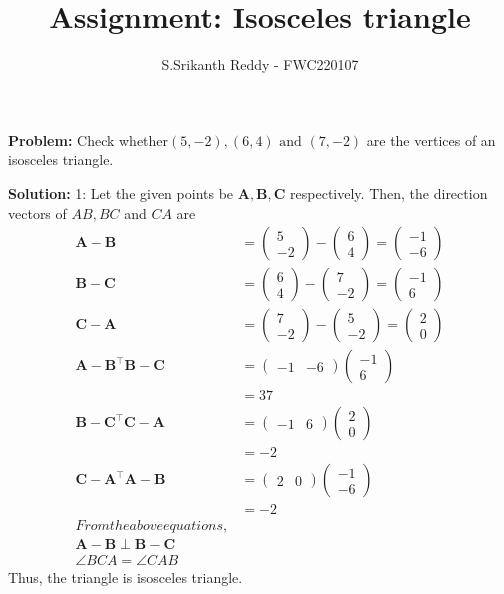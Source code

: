 \documentclass{article}
\newcommand{\myvec}[1]{\ensuremath{\begin{pmatrix}#1\end{pmatrix}}}
\let\vec\mathbf
\newcommand{\Problem}{\noindent \textbf{Problem: }}
\newcommand{\solution}{\noindent \textbf{Solution: }}
\begin{document}
\title{Assignment: Isosceles triangle}
\author{\Large S.Srikanth Reddy - FWC220107}
\date{}
\maketitle
\Problem Check whether$(5,-2),(6,4) \text{ and } (7,-2)$ are the vertices of an isosceles triangle.
\begin{table}[h!]
	\small
	\centering
	
	\end{table}

\solution 1:
Let the given points be $\vec{A}, \vec{B}, \vec{C}$ respectively. 
Then, the direction vectors of $AB, BC$ and $CA$ are
\begin{align}
\vec{A}-\vec{B}&=\myvec{5\\-2}-\myvec{6\\4}=\myvec{-1\\-6}\\
\vec{B}-\vec{C}&=\myvec{6\\4}-\myvec{7\\-2}=\myvec{-1\\6}\\
\vec{C}-\vec{A}&=\myvec{7\\-2}-\myvec{5\\-2}=\myvec{2\\0}\\
{\vec{A} -\vec{B}}^{\top}{\vec{B} -\vec{C}}&=  \myvec{-1 & -6}\myvec{-1 \\ 6}\\
&=37\\
{\vec{B} -\vec{C}}^{\top}{\vec{C} -\vec{A}}&=  \myvec{-1 & 6}\myvec{2 \\ 0}\\
&=-2\\
{\vec{C} -\vec{A}}^{\top}{\vec{A} -\vec{B}}&=  \myvec{2 & 0}\myvec{-1 \\ -6}\\
&=-2\\
From  the above equations,\\
{\vec{A} -\vec{B}}\perp {\vec{B} -\vec{C}}\\
\angle BCA = \angle CAB  
\end{align}
Thus, the triangle is isosceles triangle.
\end{document}
